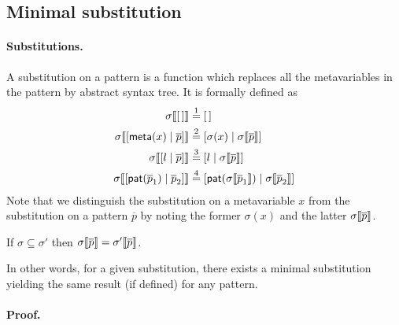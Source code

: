 
\subsection{Minimal substitution}

\paragraph{Substitutions.}

A substitution on a pattern is a function which replaces all the
meta\-variables in the pattern by abstract syntax tree. It is
formally defined as
\begin{align*}
  \subst{\el}{\sigma}
&\eqn{1} \el\\
  \subst{\cons{\cstr{meta}{x}}{\overline{p}}}{\sigma}
&\eqn{2} \cons{\sigma(x)}{\subst{\overline{p}}{\sigma}}\\
  \subst{\cons{l}{\overline{p}}}{\sigma}
&\eqn{3} \cons{l}{\subst{\overline{p}}{\sigma}}\\
  \subst{\cons{\pat{\overline{p}_1}}{\overline{p}_2}}{\sigma}
&\eqn{4}
  \cons{\pat{\subst{\overline{p}_1}{\sigma}}}%
       {\subst{\overline{p}_2}{\sigma}}
\end{align*}
Note that we distinguish the substitution on a meta\-variable
\(x\) from the substitution on a pattern \(\overline{p}\) by noting
the former \(\sigma(x)\) and the latter
\(\subst{\overline{p}}{\sigma}\).

\begin{lemma}[Minimality]\hfill
\label{minimality}
\begin{center}
If \(\sigma \subseteq \sigma'\)
then \(\subst{\overline{p}}{\sigma} = \subst{\overline{p}}{\sigma'}\).
\end{center}
\end{lemma}
\noindent In other words, for a given substitution, there exists a
minimal substitution yielding the same result (if defined) for any
pattern.

\paragraph{Proof.}

